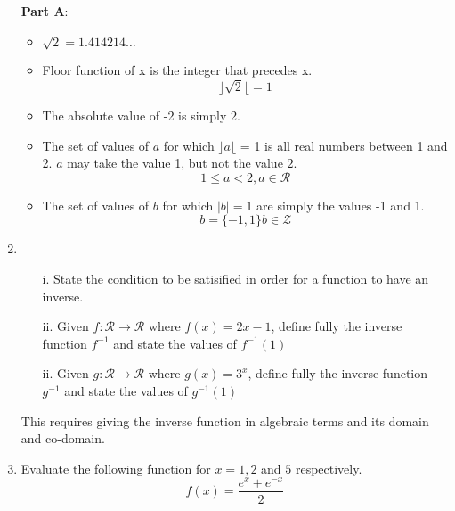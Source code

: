 \documentclass[]{article}
\begin{document}
\begin{enumerate}
\begin{framed}
\textbf{Part A}: 
\begin{itemize}
\item $\sqrt{2} = 1.414214 \ldots$
\item Floor function of x is the integer that precedes x.
\[\rfloor \sqrt{2} \lfloor = 1\]
\item The absolute value of -2 is simply 2.
\item The set of values of $a$ for which $\rfloor a \lfloor$ = 1 is all real numbers between 1 and 2. $a$ may take the value 1, but not the value $2$.
\[ 1 \leq a <2 , a \in \mathcal{R}\]
\item The set of values of $b$ for which $|b| = 1$ are simply the values -1 and 1.
\[ b= \{-1,1\}  b \in \mathcal{Z}\]
\end{itemize}
\end{framed}
\item \begin{itemize}
\item [i.] State the condition to be satisified in order for a function to have an inverse.
\item [ii.] Given $ f : \mathcal{R} \rightarrow \mathcal{R} $ where $f(x) = 2x-1$, define fully the inverse function $f^{-1}$ 
and state the values of $f^{-1}(1)$
\item [ii.] Given $ g : \mathcal{R} \rightarrow \mathcal{R} $ where $g(x) = 3^x$, define fully the inverse function $g^{-1}$ 
and state the values of $g^{-1}(1)$
\end{itemize}
This requires giving the inverse function in algebraic terms and its domain and co-domain.


\item  Evaluate the following function for $x = 1,2$ and $5$ respectively.
	\[ f(x) = \frac{e^x + {e^{-x}}}{2} \]


\end{enumerate}
\end{document}

